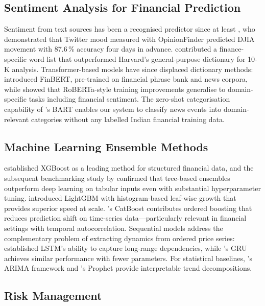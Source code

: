 \documentclass[ASNA,twocolumn]{USG}
\begin{document}
\subsection{Sentiment Analysis for Financial Prediction}

Sentiment from text sources has been a recognised predictor since at least
\citet{bollen2011}, who demonstrated that Twitter mood measured with OpinionFinder
predicted DJIA movement with 87.6\,\% accuracy four days in advance.
\citet{loughran2011} contributed a finance-specific word list that outperformed
Harvard's general-purpose dictionary for 10-K analysis. Transformer-based models
have since displaced dictionary methods: \citet{araci2019} introduced FinBERT,
pre-trained on financial phrase bank and news corpora, while \citet{liu2019}
showed that RoBERTa-style training improvements generalise to domain-specific
tasks including financial sentiment. The zero-shot categorisation capability of
\citet{lewis2019}'s BART enables our system to classify news events into
domain-relevant categories without any labelled Indian financial training data.

\subsection{Machine Learning Ensemble Methods}

\citet{chen2016} established XGBoost as a leading method for structured financial
data, and the subsequent benchmarking study by \citet{grinsztajn2022} confirmed
that tree-based ensembles outperform deep learning on tabular inputs even with
substantial hyperparameter tuning. \citet{ke2017} introduced LightGBM with
histogram-based leaf-wise growth that provides superior speed at scale.
\citet{prokhorenkova2018}'s CatBoost contributes ordered boosting that reduces
prediction shift on time-series data---particularly relevant in financial settings
with temporal autocorrelation. Sequential models address the complementary problem
of extracting dynamics from ordered price series: \citet{hochreiter1997}
established LSTM's ability to capture long-range dependencies, while
\citet{cho2014}'s GRU achieves similar performance with fewer parameters.
For statistical baselines, \citet{box2015}'s ARIMA framework and
\citet{taylor2018}'s Prophet provide interpretable trend decompositions.

\subsection{Risk Management}
\end{document}
